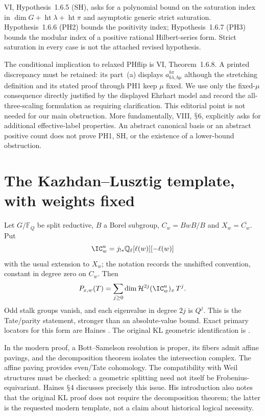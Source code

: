 \documentclass[11pt,a4paper]{article}
\newcommand{\Q}{\mathbb Q}\newcommand{\Z}{\mathbb Z}\newcommand{\C}{\mathbb C}\newcommand{\N}{\mathbb N}\newcommand{\F}{\mathbb F}
\renewcommand{\S}{\ensuremath{\mathsection}}
\theoremstyle{named}\newtheorem{finding}{Finding}[section]
\theoremstyle{definition}\newtheorem{definition}[finding]{Definition}
\theoremstyle{remark}\newtheorem{remark}[finding]{Remark}
\begin{document}
VI, Hypothesis~1.6.5 (SH), asks for a polynomial bound on the saturation index in $\dim G+\operatorname{ht}\lambda+\operatorname{ht}\pi$ and asymptotic generic strict saturation. Hypothesis~1.6.6 (PH2) bounds the positivity index; Hypothesis~1.6.7 (PH3) bounds the modular index of a positive rational Hilbert-series form. Strict saturation in every case is not the attached revised hypothesis.

The conditional implication to relaxed PHflip is VI, Theorem~1.6.8. A printed discrepancy must be retained: its part~(a) displays $a_{b\lambda,b\mu}^{b\pi}$ although the stretching definition and its stated proof through PH1 keep $\mu$ fixed. We use only the fixed-$\mu$ consequence directly justified by the displayed Ehrhart model and record the all-three-scaling formulation as requiring clarification. This editorial point is not needed for our main obstruction. More fundamentally, VIII, \S6, explicitly asks for additional effective-label properties. An abstract canonical basis or an abstract positive count does not prove PH1, SH, or the existence of a lower-bound obstruction.

\section{The Kazhdan--Lusztig template, with weights fixed}\label{sec:KL}
Let $G/\F_Q$ be split reductive, $B$ a Borel subgroup, $C_w=BwB/B$ and $X_w=\overline{C_w}$. Put
\[
 \IC_w^u=j_{!*}\Q_\ell[\ell(w)][-\ell(w)]
\]
with the usual extension to $X_w$; the notation records the unshifted convention, constant in degree zero on $C_w$. Then
\begin{equation}\label{eq:KL}
 P_{x,w}(T)=\sum_{j\ge0}\dim\mathcal H^{2j}(\IC_w^u)_x\,T^j.
\end{equation}
Odd stalk groups vanish, and each eigenvalue in degree $2j$ is $Q^j$. This is the Tate/parity statement, stronger than an absolute-value bound. Exact primary locators for this form are Haines \cite[Theorems 2.0.1, 5.0.4; Proposition 3.0.2; \S4]{Haines}. The original KL geometric identification is \cite[Theorem 4.3]{KL}.

In the modern proof, a Bott--Samelson resolution is proper, its fibers admit affine pavings, and the decomposition theorem isolates the intersection complex. The affine paving provides even/Tate cohomology. The compatibility with Weil structures must be checked: a geometric splitting need not itself be Frobenius-equivariant. Haines \S4 discusses precisely this issue. His introduction also notes that the original KL proof does not require the decomposition theorem; the latter is the requested modern template, not a claim about historical logical necessity.
\end{document}
